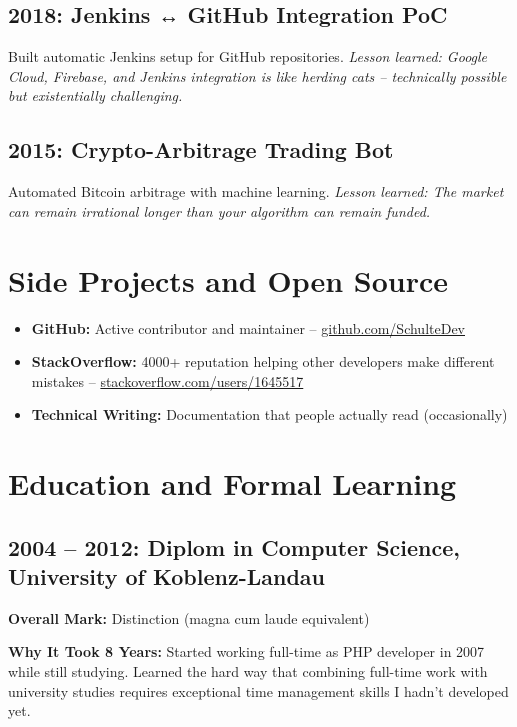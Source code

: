 \documentclass[11pt,a4paper]{article}
\begin{document}
\subsection{2018: Jenkins ↔ GitHub Integration PoC}
Built automatic Jenkins setup for GitHub repositories. \textit{Lesson learned: Google Cloud, Firebase, and Jenkins integration is like herding cats -- technically possible but existentially challenging.}

\subsection{2015: Crypto-Arbitrage Trading Bot}
Automated Bitcoin arbitrage with machine learning. \textit{Lesson learned: The market can remain irrational longer than your algorithm can remain funded.}

\vspace{6pt}

\section{Side Projects and Open Source}
\begin{itemize}[leftmargin=15pt, topsep=0pt, itemsep=1pt]
\item \textbf{GitHub:} Active contributor and maintainer -- \href{https://github.com/SchulteDev}{github.com/SchulteDev}
\item \textbf{StackOverflow:} 4000+ reputation helping other developers make different mistakes -- \href{https://stackoverflow.com/users/1645517}{stackoverflow.com/users/1645517}
\item \textbf{Technical Writing:} Documentation that people actually read (occasionally)
\end{itemize}

\newpage

\section{Education and Formal Learning}

\subsection{2004 -- 2012: Diplom in Computer Science, University of Koblenz-Landau}
\textbf{Overall Mark:} Distinction (magna cum laude equivalent)

\textbf{Why It Took 8 Years:} Started working full-time as PHP developer in 2007 while still studying. Learned the hard way that combining full-time work with university studies requires exceptional time management skills I hadn't developed yet.
\end{document}
